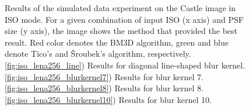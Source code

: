 \documentclass[12pt,notitlepage]{report}
\begin{document}
\begin{figure}[h]
  \caption[Simulated-data experiment on the Castle image in ISO mode]{Results of the simulated data experiment on the Castle image in ISO mode. For a given combination of input ISO (x axis) and PSF size (y axis), the image shows the method that provided the best result. Red color denotes the BM3D algorithm, green and blue denote Tico's and Šroubek's algorithm, respectively. \ref{fig:iso_lena256_line}) Results for diagonal line-shaped blur kernel. \ref{fig:iso_lena256_blurkernel7}) Results for blur kernel 7. \ref{fig:iso_lena256_blurkernel8}) Results for blur kernel 8. \ref{fig:iso_lena256_blurkernel10}) Results for blur kernel 10.}
  \label{fig:iso_castle256}
\end{figure}

\clearpage
\end{document}
